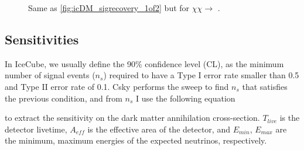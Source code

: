\begin{figure}[t]
    \caption{Same as \cref{fig:icDM_sigrecovery_1of2} but for $\chi\chi \rightarrow$ \parpar{\nu_\mu}.}
    \label{fig:icDM_sigrecovery_2of2}
\end{figure}

\subsection{Sensitivities} \label{sec:icDM_sensitivity}

In IceCube, we usually define the 90\% confidence level (CL), as the minimum number of signal events ($n_s$) required to have a Type I error rate smaller than 0.5 and Type II error rate of 0.1.
Csky performs the sweep to find $n_s$ that satisfies the previous condition, and from $n_s$ I use the following equation
\svFromNSig

to extract the sensitivity on the dark matter annihilation cross-section.
$ T_{live} $ is the detector livetime, $ A_{eff} $ is the effective area of the detector, and $ E_{min} $, $ E_{max} $ are the minimum, maximum energies of the expected neutrinos, respectively.

